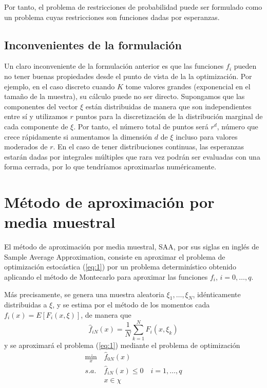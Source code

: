 \documentclass[twoside,a4paper,openright,12pt]{book}
\begin{document}
Por tanto, el problema de restricciones de probabilidad puede ser formulado como un problema cuyas restricciones son funciones dadas por esperanzas.


\subsection*{Inconvenientes de la formulación}
Un claro inconveniente de la formulación anterior es que las funciones $f_i$ pueden no tener buenas propiedades desde el punto de vista de la la optimización. Por ejemplo, en el caso discreto cuando $K$ tome valores grandes (exponencial en el tamaño de la muestra), su cálculo puede no ser directo. Supongamos que las componentes del vector $\xi$ están distribuidas de manera que son independientes entre sí y utilizamos $r$ puntos para la discretización de la distribución marginal de cada componente de $\xi$. Por tanto, el número total de puntos será $r^d$, número que crece rápidamente si aumentamos la dimensión $d$ de $\xi$ incluso para valores moderados de $r$. En el caso de tener distribuciones continuas, las esperanzas estarán dadas por integrales múltiples que rara vez podrán ser evaluadas con una forma cerrada, por lo que tendríamos aproximarlas numéricamente.


\section{Método de aproximación por media muestral}

El método de aproximación por media muestral, SAA, por sus siglas en inglés de Sample Average Approximation, consiste en aproximar el problema de optimización estocástica (\ref{eq:1}) por un problema determinístico obtenido aplicando el método de Montecarlo para aproximar las funciones $f_i$, $i=0,\dotsc,q$.

Más precisamente, se genera una muestra aleatoria $\xi_1,\dotsc,\xi_N$, idénticamente distribuidas a $\xi$, y se estima por el método de los momentos cada $f_i(x)=E[F_i(x,\xi)]$, de manera que 
$$
\hat{f}_{iN}(x)=\frac{1}{N}\sum_{k=1}^N F_i(x,\xi_k)
$$
y se aproximará el problema (\ref{eq:1}) mediante el problema de optimización
\begin{align}
\min_{x} &\hat{f}_{0N}(x)  \nonumber\\ 
s.a.\;  & \hat{f}_{iN}(x)\leq 0 \quad i=1,\dotsc,q \tag{3} \label{eq:3}\\
& x\in\chi \nonumber
\end{align}
\end{document}
